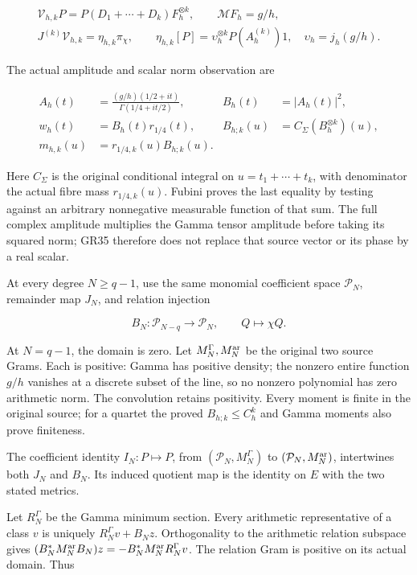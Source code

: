 \[
\begin{gathered}
\mathcal V_{h,k}P=P(D_1+\cdots+D_k)F_h^{\otimes k},\qquad
\mathcal MF_h=g/h,\\
J^{(k)}\mathcal V_{h,k}=\eta_{h,k}\pi_\chi,\qquad
\eta_{h,k}[P]=\upsilon_h^{\otimes k}P(A_h^{(k)})1,\quad
\upsilon_h=j_h(g/h).
\end{gathered}
\tag{GR34}
\]

The actual amplitude and scalar norm observation are

\[
\begin{aligned}
A_h(t)&=\frac{(g/h)(1/2+it)}{\Gamma(1/4+it/2)},&
B_h(t)&=|A_h(t)|^2,\\
w_h(t)&=B_h(t)r_{1/4}(t),&
B_{h;k}(u)&=C_\Sigma(B_h^{\otimes k})(u),\\
m_{h,k}(u)&=r_{1/4,k}(u)B_{h;k}(u).
\end{aligned}
\tag{GR35}
\]

Here \(C_\Sigma\) is the original conditional integral on \(u=t_1+\cdots+t_k\), with denominator the actual fibre mass \(r_{1/4,k}(u)\). Fubini proves the last equality by testing against an arbitrary nonnegative measurable function of that sum. The full complex amplitude multiplies the Gamma tensor amplitude before taking its squared norm; GR35 therefore does not replace that source vector or its phase by a real scalar.

At every degree \(N\ge q-1\), use the same monomial coefficient space \(\mathcal P_N\), remainder map \(J_N\), and relation injection

\[
B_N:\mathcal P_{N-q}\longrightarrow\mathcal P_N,\qquad Q\longmapsto\chi Q.
\tag{GR36}
\]

At \(N=q-1\), the domain is zero. Let \(M_N^\Gamma,M_N^{\rm ar}\) be the original two source Grams. Each is positive: Gamma has positive density; the nonzero entire function \(g/h\) vanishes at a discrete subset of the line, so no nonzero polynomial has zero arithmetic norm. The convolution retains positivity. Every moment is finite in the original source; for a quartet the proved \(B_{h;k}\le C_h^k\) and Gamma moments also prove finiteness.

The coefficient identity \(I_N:P\mapsto P\), from \((\mathcal P_N,M_N^\Gamma)\) to \((\mathcal P_N,M_N^{\rm ar})\), intertwines both \(J_N\) and \(B_N\). Its induced quotient map is the identity on \(E\) with the two stated metrics.

Let \(R_N^\Gamma\) be the Gamma minimum section. Every arithmetic representative of a class \(v\) is uniquely \(R_N^\Gamma v+B_Nz\). Orthogonality to the arithmetic relation subspace gives \((B_N^*M_N^{\rm ar}B_N)z=-B_N^*M_N^{\rm ar}R_N^\Gamma v\). The relation Gram is positive on its actual domain. Thus

